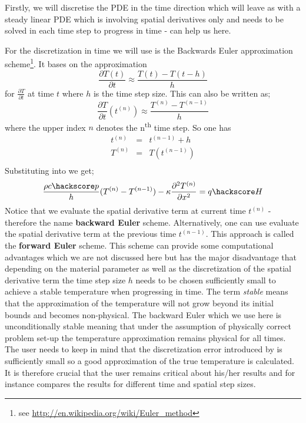 Firstly, we will discretise the PDE  in the time direction which will
leave as with a steady linear PDE which is involving spatial derivatives only and needs to be solved in each time 
step to progress in time - \esc can help us here.

For the discretization in time we will use is the Backwards Euler approximation scheme\footnote{see \url{http://en.wikipedia.org/wiki/Euler_method}}. It bases on the
approximation 
\begin{equation}
\frac{\partial T(t)}{\partial t} \approx \frac{T(t)-T(t-h)}{h}
\label{eqn:beuler}
\end{equation}
for  $\frac{\partial T}{\partial t}$  at time $t$ 
where $h$ is the time step size. This can also be written as;
\begin{equation}
\frac{\partial T}{\partial t}(t^{(n)}) \approx \frac{T^{(n)} - T^{(n-1)}}{h}
\label{eqn:Tbeuler}
\end{equation}
where the upper index $n$ denotes the n\textsuperscript{th} time step. So one has
\begin{equation}
\begin{array}{rcl}
t^{(n)} & = & t^{(n-1)}+h \\
T^{(n)} & = & T(t^{(n-1)}) \\ 
\end{array}
\label{eqn:Neuler}
\end{equation}
Substituting  into  we get;
\begin{equation}
\frac{\rho c\hackscore p}{h} (T^{(n)} - T^{(n-1)}) - \kappa \frac{\partial^{2} T^{(n)}}{\partial x^{2}} = q\hackscore H 
\label{eqn:hddisc}
\end{equation}
Notice that we evaluate the spatial derivative term at current time $t^{(n)}$ - therefore the name \textbf{backward Euler} scheme. Alternatively, one can use evaluate the spatial derivative term at the previous time $t^{(n-1)}$. This 
approach is called the \textbf{forward Euler} scheme. This scheme can provide some computational advantages which
we are not discussed here but has the major disadvantage that depending on the 
material parameter as well as the discretization of the spatial derivative term the time step size $h$ needs to be chosen sufficiently small to achieve a stable temperature when progressing in time. The term \textit{stable} means
that the approximation of the temperature will not grow beyond its initial bounds and becomes non-physical. 
The backward Euler which we use here is unconditionally stable meaning that under the assumption of
physically correct problem set-up the temperature approximation remains physical for all times. 
The user needs to keep in mind that the discretization error introduced by  
is sufficiently small so a good approximation of the true temperature is calculated. It is
therefore crucial that the user remains critical about his/her results and for instance compares 
the results for different time and spatial step sizes. 

